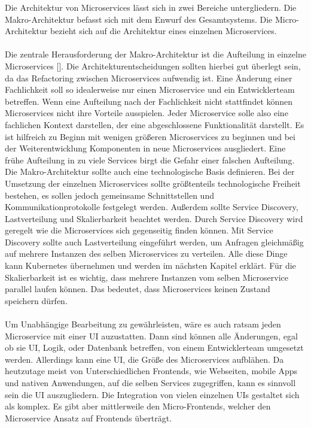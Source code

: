 Die Architektur von Microservices lässt sich in zwei Bereiche untergliedern. Die Makro-Architektur befasst sich mit dem Enwurf des Gesamtsystems. Die Micro-Architektur bezieht sich auf die Architektur eines einzelnen Microservices. \\
\\
Die zentrale Herausforderung der Makro-Architektur ist die Aufteilung in einzelne Microservices [\cite[S. 102]{wolffMicroservices2018}]. Die Architekturentscheidungen sollten hierbei gut überlegt sein, da das Refactoring zwischen Microservices aufwendig ist. Eine Änderung einer Fachlichkeit soll so idealerweise nur einen Microservice und ein Entwicklerteam betreffen. Wenn eine Aufteilung nach der Fachlichkeit nicht stattfindet können Microservices nicht ihre Vorteile ausspielen. Jeder Microservice solle also eine fachlichen Kontext darstellen, der eine abgeschlossene Funktionalität darstellt. Es ist hilfreich zu Beginn mit wenigen größeren Microservices zu beginnen und bei der Weiterentwicklung Komponenten in neue Microservices ausgliedert. Eine frühe Aufteilung in zu viele Services birgt die Gefahr einer falschen Aufteilung. Die Makro-Architektur sollte auch eine technologische Basis definieren. Bei der Umsetzung der einzelnen Microservices sollte größtenteils technologische Freiheit bestehen, es sollen jedoch gemeinsame Schnittstellen und Kommunikationprotokolle festgelegt werden. Außerdem sollte Service Discovery, Lastverteilung und Skalierbarkeit beachtet werden. Durch Service Discovery wird geregelt wie die Microservices sich gegenseitig finden können. Mit Service Discovery sollte auch Lastverteilung eingeführt werden, um Anfragen gleichmäßig auf mehrere Instanzen des selben Microservices zu verteilen. Alle diese Dinge kann Kubernetes übernehmen und werden im nächsten Kapitel erklärt. Für die Skalierbarkeit ist es wichtig, dass mehrere Instanzen vom selben Microservice parallel laufen können. Das bedeutet, dass Microservices keinen Zustand speichern dürfen. \\
\\
Um Unabhängige Bearbeitung zu gewährleisten, wäre es auch ratsam jeden Microservice mit einer UI auzustatten. Dann sind können alle Änderungen, egal ob sie UI, Logik, oder Datenbank betreffen, von einem Entwicklerteam umgesetzt werden. Allerdings kann eine UI, die Größe des Microservices aufblähen. Da heutzutage meist von Unterschiedlichen Frontends, wie Webseiten, mobile Apps und nativen Anwendungen, auf die selben Services zugegriffen, kann es sinnvoll sein die UI auszugliedern. Die Integration von vielen einzelnen UIs gestaltet sich als komplex. Es gibt aber mittlerweile den Micro-Frontends, welcher den Microservice Ansatz auf Frontends überträgt.  \\
